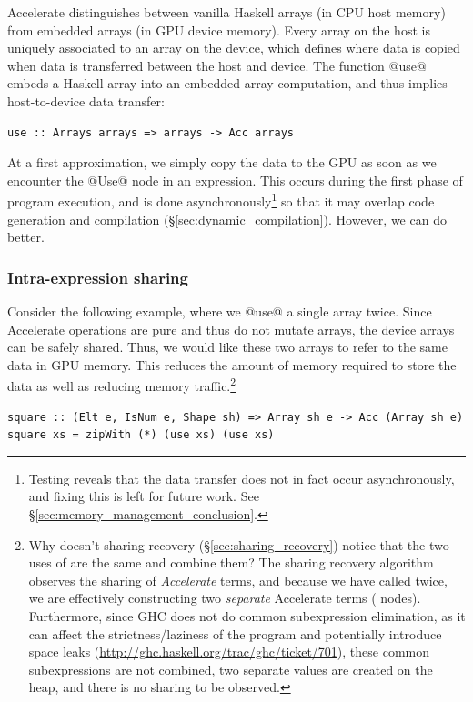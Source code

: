 Accelerate distinguishes between vanilla Haskell arrays (in CPU host memory)
from embedded arrays (in GPU device memory). Every array on the host is
uniquely associated to an array on the device, which defines where data is
copied when data is transferred between the host and device. The function
@use@ embeds a Haskell array into an embedded array computation, and thus
implies host-to-device data transfer:
%
\begin{lstlisting}[style=haskell,numbers=none]
use :: Arrays arrays => arrays -> Acc arrays
\end{lstlisting}
%

At a first approximation, we simply copy the data to the GPU as soon as we
encounter the @Use@ node in an expression. This occurs during the first
phase of program execution, and is done asynchronously\footnote{Testing reveals
that the data transfer does not in fact occur asynchronously, and fixing this is
left for future work. See \S\ref{sec:memory_management_conclusion}.}
so that it may overlap code generation and compilation
(\S\ref{sec:dynamic_compilation}). However, we can do better.

\subsubsection{Intra-expression sharing}

Consider the following example, where we @use@ a single array twice. Since
Accelerate operations are pure and thus do not mutate arrays, the device arrays
can be safely shared. Thus, we would like these two arrays to refer to the same
data in GPU memory. This reduces the amount of memory required to store the
data as well as reducing memory traffic.\footnote{Why doesn't sharing recovery
(\S\ref{sec:sharing_recovery}) notice that the two uses of  are
the same and combine them? The sharing recovery algorithm observes the sharing
of \emph{Accelerate} terms, and because we have called  twice, we
are effectively constructing two \emph{separate} Accelerate terms
( nodes). Furthermore, since GHC does not do common subexpression
elimination, as it can affect the strictness/laziness of the program and
potentially introduce space leaks
(\url{http://ghc.haskell.org/trac/ghc/ticket/701}), these common subexpressions
are not combined, two separate values are created on the heap, and there is no
sharing to be observed.}
%
\begin{lstlisting}[style=haskell]
square :: (Elt e, IsNum e, Shape sh) => Array sh e -> Acc (Array sh e)
square xs = zipWith (*) (use xs) (use xs)
\end{lstlisting}

